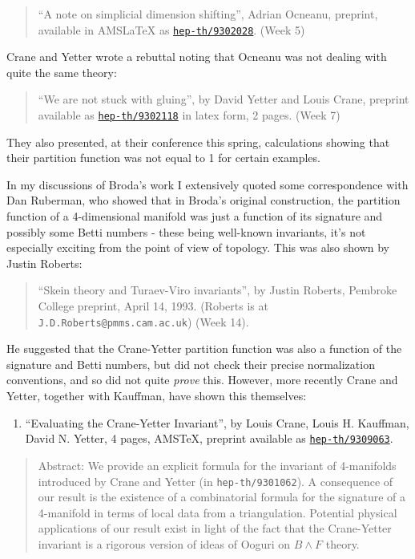 \documentclass{article}
\def\tightlist{}
\begin{document}
\begin{quote}
``A note on simplicial dimension shifting'', Adrian Ocneanu, preprint,
available in AMSLaTeX as
\href{http://xxx.lanl.gov/abs/hep-th/9302028}{\texttt{hep-th/9302028}}.
(Week 5)
\end{quote}

Crane and Yetter wrote a rebuttal noting that Ocneanu was not dealing
with quite the same theory:

\begin{quote}
``We are not stuck with gluing'', by David Yetter and Louis Crane,
preprint available as
\href{http://xxx.lanl.gov/abs/hep-th/9302118}{\texttt{hep-th/9302118}}
in latex form, 2 pages. (Week 7)
\end{quote}

They also presented, at their conference this spring, calculations
showing that their partition function was not equal to 1 for certain
examples.

In my discussions of Broda's work I extensively quoted some
correspondence with Dan Ruberman, who showed that in Broda's original
construction, the partition function of a 4-dimensional manifold was
just a function of its signature and possibly some Betti numbers - these
being well-known invariants, it's not especially exciting from the point
of view of topology. This was also shown by Justin Roberts:

\begin{quote}
``Skein theory and Turaev-Viro invariants'', by Justin Roberts, Pembroke
College preprint, April 14, 1993. (Roberts is at
\texttt{J.D.Roberts@pmms.cam.ac.uk}) (Week 14).
\end{quote}

He suggested that the Crane-Yetter partition function was also a
function of the signature and Betti numbers, but did not check their
precise normalization conventions, and so did not quite \emph{prove}
this. However, more recently Crane and Yetter, together with Kauffman,
have shown this themselves:

\begin{enumerate}
\def\labelenumi{\arabic{enumi})}
\tightlist
\item
  ``Evaluating the Crane-Yetter Invariant'', by Louis Crane, Louis H.
  Kauffman, David N. Yetter, 4 pages, AMSTeX, preprint available as
  \href{http://xxx.lanl.gov/abs/hep-th/9309063}{\texttt{hep-th/9309063}}.
\end{enumerate}

\begin{quote}
Abstract: We provide an explicit formula for the invariant of
4-manifolds introduced by Crane and Yetter (in \texttt{hep-th/9301062}).
A consequence of our result is the existence of a combinatorial formula
for the signature of a 4-manifold in terms of local data from a
triangulation. Potential physical applications of our result exist in
light of the fact that the Crane-Yetter invariant is a rigorous version
of ideas of Ooguri on \(B \wedge F\) theory.
\end{quote}
\end{document}
